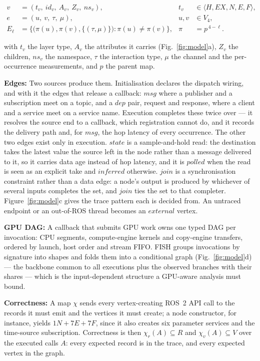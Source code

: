 \begin{align*}
  v &= (t_v,\ \mathit{id}_v,\ A_v,\ Z_v,\ \mathit{ns}_v), &
  t_v &\in \langle H,\mathit{EX},N,E,F\rangle,\\[2pt]
  e &= (u,\ v,\ \tau,\ \mu), & u,v &\in V_4,\\[2pt]
  E_\ell &= \bigl\{\bigl(\pi(u),\pi(v),\{(\tau,\mu)\}\bigr):\pi(u)\neq\pi(v)\bigr\},
  & \pi &= p^{\,4-\ell}.
\end{align*}

with $t_v$ the layer type, $A_v$ the attributes it carries
(Fig.~\ref{fig:model}a), $Z_v$ the children, $\mathit{ns}_v$ the namespace,
$\tau$ the interaction type, $\mu$ the channel and the per-occurrence
measurements, and $p$ the parent map.

\noindent
\textbf{Edges:}
Two sources produce them. Initialisation declares the dispatch wiring, and with
it the edges that release a callback: $\mathit{msg}$ where a publisher and a
subscription meet on a topic, and a $\mathit{dep}$ pair, request and response,
where a client and a service meet on a service name. Execution completes these
twice over --- it resolves the source end to a callback, which registration
cannot do, and it records the delivery path and, for $\mathit{msg}$, the hop
latency of every occurrence. The other two edges exist only in execution.
$\mathit{state}$ is a sample-and-hold read: the destination takes the latest
value the source left in the node rather than a message delivered to it, so it
carries data age instead of hop latency, and it is $\mathit{polled}$ when the
read is seen as an explicit take and $\mathit{inferred}$ otherwise.
$\mathit{join}$ is a synchronisation constraint rather than a data edge: a
node's output is produced by whichever of several inputs completes the set, and
$\mathit{join}$ ties the set to that completer. Figure~\ref{fig:model}c gives
the trace pattern each is decided from. An untraced endpoint or an out-of-ROS
thread becomes an $\mathit{external}$ vertex.

\noindent
\textbf{GPU DAG:}
A callback that submits GPU work owns one typed DAG per invocation: CPU
segments, compute-engine kernels and copy-engine transfers, ordered by launch,
host order and stream FIFO. FISH groups invocations by signature into shapes and
folds them into a conditional graph (Fig.~\ref{fig:model}d) --- the backbone
common to all executions plus the observed branches with their shares --- which
is the input-dependent structure a GPU-aware analysis must bound.

\noindent
\textbf{Correctness:}
A map $\chi$ sends every vertex-creating ROS~2 API call to the records it must
emit and the vertices it must create; a node constructor, for instance, yields
$1N+7E+7F$, since it also creates six parameter services and the time-source
subscription. Correctness is then $\chi_r(A)\subseteq R$ and $\chi_v(A)\subseteq
V$ over the executed calls $A$: every expected record is in the trace, and every
expected vertex in the graph.
